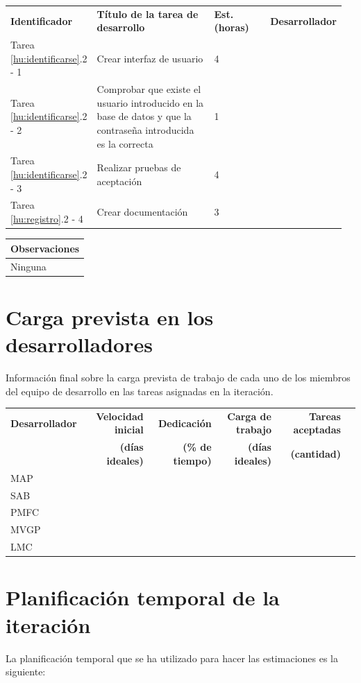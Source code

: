 \documentclass[11pt]{article}
\begin{document}
\begin{longtable}{p{0.18\linewidth}|p{0.4\linewidth}|p{0.18\linewidth}|p{0.2\linewidth}}
	\toprule
	\textbf{Identificador} & \textbf{Título de la tarea de desarrollo} & \textbf{Est. (horas)} & \textbf{Desarrollador} \\
        Tarea \ref{hu:identificarse}.2 - 1 & Crear interfaz de usuario & 4 &\\
        Tarea \ref{hu:identificarse}.2 - 2 & Comprobar que existe el usuario introducido en la base de datos y que la contraseña introducida es la correcta & 1 & \\
        Tarea \ref{hu:identificarse}.2 - 3 & Realizar pruebas de aceptación & 4 & \\
       	Tarea \ref{hu:registro}.2 - 4 & Crear documentación & 3 & \\
	\bottomrule
\end{longtable}


\begin{longtable}{p{1.028\linewidth}}
	\textbf{Observaciones}\\
	\midrule
	Ninguna\\
	\bottomrule
	\bottomrule
\end{longtable}




\section{Carga prevista en los desarrolladores}

Información final sobre la carga prevista de trabajo de cada uno de los miembros del equipo de desarrollo en las tareas asignadas en la iteración.

\begin{longtable}{lrrrrr}
  \toprule
  \textbf{Desarrollador} & \textbf{Velocidad inicial} & \textbf{Dedicación} & \textbf{Carga de trabajo} & \textbf{Tareas aceptadas} \\
  & \textbf{(días ideales)} & \textbf{(\% de tiempo)} & \textbf{(días ideales)} & \textbf{ (cantidad)}\\
  \midrule
  MAP &  & \\
  SAB &  & \\
  PMFC \\
  MVGP & & \\
  LMC \\
  \bottomrule
\end{longtable}

\section{Planificación temporal de la iteración}
La planificación temporal que se ha utilizado para hacer las estimaciones es la siguiente:
\end{document}
